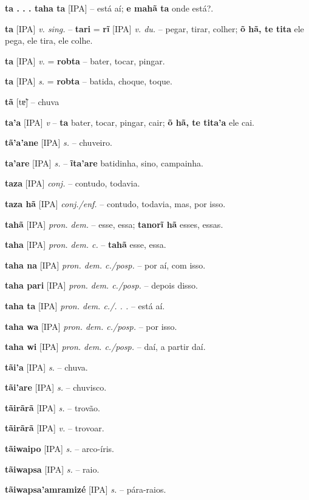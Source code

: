 \textbf{ta . . . taha ta} [IPA] \textit{} -- está aí; \textbf{e mahã ta} onde está?.

\textbf{ta} [IPA] \textit{v. sing.} -- \textbf{tari} = \textbf{rĩ} [IPA] \textit{v. du.} -- pegar, tirar, colher; \textbf{õ hã, te tita} ele pega, ele tira, ele colhe.

\textbf{ta} [IPA] \textit{v.} = \textbf{robta} -- bater, tocar, pingar.

\textbf{ta} [IPA] \textit{s.} = \textbf{robta} -- batida, choque, toque.

\textbf{tã} [tɐ̃] -- chuva

\textbf{ta'a} [IPA] \textit{v} -- \textbf{ta} bater, tocar, pingar, cair; \textbf{õ hã, te tita'a} ele cai.

\textbf{tã'a'ane} [IPA] \textit{s.} -- chuveiro.

\textbf{ta'are} [IPA] \textit{s.} -- \textbf{ĩta'are} batidinha, sino, campainha.

\textbf{taza} [IPA] \textit{conj.} -- contudo, todavia.

\textbf{taza hã} [IPA] \textit{conj./enf.} -- contudo, todavia, mas, por isso.

\textbf{tahã} [IPA] \textit{pron. dem.} -- esse, essa; \textbf{tanorĩ hã} esses, essas.

\textbf{taha} [IPA] \textit{pron. dem. c.} -- \textbf{tahã} esse, essa.

\textbf{taha na} [IPA] \textit{pron. dem. c./posp.} -- por aí, com isso.

\textbf{taha pari} [IPA] \textit{pron. dem. c./posp.} -- depois disso.

\textbf{taha ta} [IPA] \textit{pron. dem. c./. . .} -- está aí.

\textbf{taha wa} [IPA] \textit{pron. dem. c./posp.} -- por isso.

\textbf{taha wi} [IPA] \textit{pron. dem. c./posp.} -- daí, a partir daí.

\textbf{tãi'a} [IPA] \textit{s.} -- chuva.

\textbf{tãi'are} [IPA] \textit{s.} -- chuvisco.

\textbf{tãirãrã} [IPA] \textit{s.} -- trovão.

\textbf{tãirãrã} [IPA] \textit{v.} -- trovoar.

\textbf{tãiwaipo} [IPA] \textit{s.} -- arco-íris.

\textbf{tãiwapsa} [IPA] \textit{s.} -- raio.

\textbf{tãiwapsa'amramizé} [IPA] \textit{s.} -- pára-raios.

